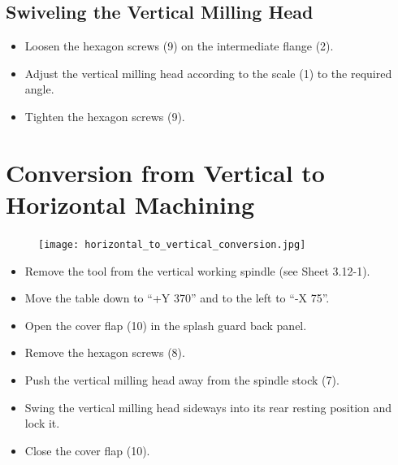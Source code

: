 \vspace{0.3cm}

\subsection{Swiveling the Vertical Milling Head}

\begin{itemize}
    \item Loosen the hexagon screws (9) on the intermediate flange (2).
    \item Adjust the vertical milling head according to the scale (1) to the required angle.
    \item Tighten the hexagon screws (9).
\end{itemize}


\vspace{0.3cm}


\section{Conversion from Vertical to Horizontal Machining}

\begin{figure}[h]
    \centering
    \texttt{[image: horizontal\_to\_vertical\_conversion.jpg]}
    \label{fig:vertical_to_horizontal_conversion}
\end{figure}

\begin{itemize}
    \item Remove the tool from the vertical working spindle (see Sheet 3.12-1).
    \item Move the table down to \enquote{+Y 370} and to the left to \enquote{-X 75}.\footnotemark
    \item Open the cover flap (10) in the splash guard back panel.
    \item Remove the hexagon screws (8).
    \item Push the vertical milling head away from the spindle stock (7).
    \item Swing the vertical milling head sideways into its rear resting position and lock it.
    \item Close the cover flap (10).
\end{itemize}

